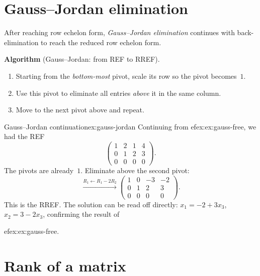 \section{Gauss--Jordan elimination}\label{sec:gauss-jordan}

After reaching row echelon form, \emph{Gauss--Jordan elimination}
continues with back-elimination to reach the reduced row echelon form.

\medskip
\noindent\textbf{Algorithm} (Gauss--Jordan: from REF to RREF).
\begin{enumerate}[label=\textbf{Step \arabic*.}]
  \item Starting from the \emph{bottom-most} pivot, scale its row so
    the pivot becomes~$1$.
  \item Use this pivot to eliminate all entries \emph{above} it in the
    same column.
  \item Move to the next pivot above and repeat.
\end{enumerate}

\begin{example}{Gauss--Jordan continuation}{ex:gauss-jordan}
Continuing from 
ef{ex:ex:gauss-free}, we had the REF
\[
  \left(\begin{array}{ccc|c}
    1 & 2 & 1 & 4\\
    0 & 1 & 2 & 3\\
    0 & 0 & 0 & 0
  \end{array}\right).
\]
The pivots are already~$1$. Eliminate above the second pivot:
\[
  \xrightarrow{R_1 \leftarrow R_1 - 2R_2}
  \left(\begin{array}{ccc|c}
    1 & 0 & -3 & -2\\
    0 & 1 & 2 & 3\\
    0 & 0 & 0 & 0
  \end{array}\right).
\]
This is the RREF. The solution can be read off directly:
$x_1 = -2 + 3x_3$, $x_2 = 3 - 2x_3$, confirming the result of

ef{ex:ex:gauss-free}.
\end{example}


\section{Rank of a matrix}\label{sec:matrix-rank}

